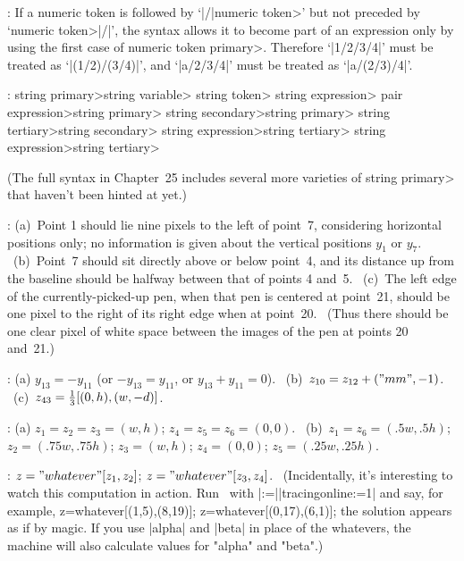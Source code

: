 :
 If a numeric token is followed by `|/|\<numeric token>' but
not preceded by `\<numeric token>|/|', the syntax allows it to become part of
an expression only by using the first case of \<numeric token
primary>. Therefore `|1/2/3/4|' must be treated as `|(1/2)/(3/4)|',
and `|a/2/3/4|' must be treated as `|a/(2/3)/4|'.

:
 \<string primary>\is\<string variable>\parbreak
\qquad\alt\<string token>\parbreak
\def\\#1{\thinspace{\tt#1}\thinspace}%
\qquad\alt\\(\<string expression>\\)\parbreak
\qquad\alt\\{substring}\<pair expression>\\{of}\<string primary>\parbreak
\<string secondary>\is\<string primary>\parbreak
\<string tertiary>\is\<string secondary>\parbreak
\<string expression>\is\<string tertiary>\parbreak
\qquad\alt\<string expression>\\{\char`\&}\<string tertiary>\par
\medskip\noindent
(The full syntax in Chapter~25 includes several more varieties of
\<string primary> that haven't been hinted at yet.)

:
 (a)~Point 1 should lie nine pixels to the left of point~7,
considering horizontal positions only; no information is given about the
vertical positions $y_1$ or $y_7$. \ (b)~Point~7 should sit directly
above or below point~4, and its distance up from the baseline should be
halfway between that of points 4 and~5. \ (c)~The left edge of the
currently-picked-up pen, when that pen is centered at point~21, should be
one pixel to the right of its right edge when at point~20. \ (Thus there
should be one clear pixel of white space between the images of the
pen at points 20 and~21.)

:
 (a) $y_{13}=-y_{11}$ (or $-y_{13}=y_{11}$, or $y_{13}+y_{11}=0$).
\ (b)~$z_{10}=z_{12}+("mm",-1)$. \ (c)~$z_{43}={1\over3}[(0,h),(w,-d)]$.

:
 (a) $z_1=z_2=z_3=(w,h)$; $z_4=z_5=z_6=(0,0)$.
\ (b)~$z_1=z_6=(.5w,.5h)$; $z_2=(.75w,.75h)$; $z_3=(w,h)$;
$z_4=(0,0)$; $z_5=(.25w,.25h)$.

:
 $z="whatever"[z_1,z_2]$; $z="whatever"[z_3,z_4]$. \ (Incidentally,
it's interesting to watch this computation in action. Run \MF\ with
|\tracingequations:=|\allowbreak|tracingonline:=1| and say, for example,
\begintt
z=whatever[(1,5),(8,19)]; z=whatever[(0,17),(6,1)];
\endtt
the solution appears as if by magic.
If you use |alpha| and |beta| in place of the whatevers, the machine will
also calculate values for "alpha" and "beta".)

